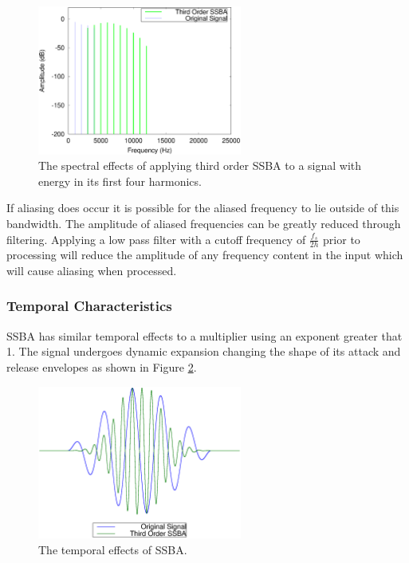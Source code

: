 			\begin{figure}[h!]
				\centering
				\includegraphics[width=0.6\textwidth]{chapter3/Images/SSBA3Spectra.eps}
				\caption{The spectral effects of applying third order SSBA to a signal with energy in its 
				         first four harmonics.}
				\label{fig:SSBA3Spectra}
			\end{figure}

			If aliasing does occur it is possible for the aliased frequency to lie outside of this bandwidth.
			The amplitude of aliased frequencies can be greatly reduced through filtering. Applying a low pass
			filter with a cutoff frequency of $\frac{f_{s}}{2h}$ prior to processing will reduce the amplitude
			of any frequency content in the input which will cause aliasing when processed.

		\subsubsection*{Temporal Characteristics}
			SSBA has similar temporal effects to a multiplier using an exponent greater that 1. The signal
			undergoes dynamic expansion changing the shape of its attack and release envelopes as shown in
			Figure \ref{fig:SSBATemporalEffects}.

			\begin{figure}[h!]
				\centering
				\includegraphics[width=0.6\textwidth]{chapter3/Images/SSBATemporalEffects.eps}
				\caption{The temporal effects of SSBA.}
				\label{fig:SSBATemporalEffects}
			\end{figure}

